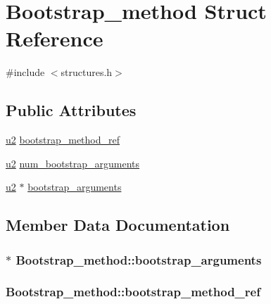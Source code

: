 \hypertarget{structBootstrap__method}{}\section{Bootstrap\+\_\+method Struct Reference}
\label{structBootstrap__method}


{\ttfamily \#include $<$structures.\+h$>$}

\subsection*{Public Attributes}
\begin{DoxyCompactItemize}
\item 
\hyperlink{structures_8h_a55ef8d87fd202b8417704c089899c5b9}{u2} \hyperlink{structBootstrap__method_a07ab37cf19bc567885052f4160dc2018}{bootstrap\+\_\+method\+\_\+ref}
\item 
\hyperlink{structures_8h_a55ef8d87fd202b8417704c089899c5b9}{u2} \hyperlink{structBootstrap__method_a492a9b7d938c1c6d98b7100530c3dfc1}{num\+\_\+bootstrap\+\_\+arguments}
\item 
\hyperlink{structures_8h_a55ef8d87fd202b8417704c089899c5b9}{u2} $\ast$ \hyperlink{structBootstrap__method_ab53d18c059e8ebe5e90ec64cafc2361f}{bootstrap\+\_\+arguments}
\end{DoxyCompactItemize}


\subsection{Member Data Documentation}
\subsubsection[{\texorpdfstring{bootstrap\+\_\+arguments}{bootstrap_arguments}}]{$\ast$ Bootstrap\+\_\+method\+::bootstrap\+\_\+arguments}\hypertarget{structBootstrap__method_ab53d18c059e8ebe5e90ec64cafc2361f}{}\label{structBootstrap__method_ab53d18c059e8ebe5e90ec64cafc2361f}
\subsubsection[{\texorpdfstring{bootstrap\+\_\+method\+\_\+ref}{bootstrap_method_ref}}]{ Bootstrap\+\_\+method\+::bootstrap\+\_\+method\+\_\+ref}\hypertarget{structBootstrap__method_a07ab37cf19bc567885052f4160dc2018}{}\label{structBootstrap__method_a07ab37cf19bc567885052f4160dc2018}
